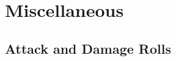\documentclass[letterpaper,openany,oneside,twocolumn]{book}
\begin{document}
%    
%
%    
%    
%    
%	
%    

\vfill\eject
\section*{Miscellaneous}
\subsection*{Attack and Damage Rolls}
\end{document}
